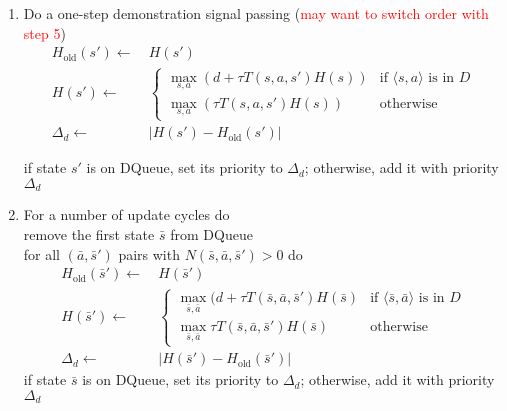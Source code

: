 \documentclass{article}
\begin{document}
\begin{enumerate}
\item Do a one-step demonstration signal passing (\textcolor{red}{may want to switch order with step 5})\\
\[
\begin{split}
H_{\text{old}}(s') \leftarrow\ & H(s')\\
H(s') \leftarrow\ & \begin{cases}
    \max_{s,a} (d + \tau T(s,a,s') H(s))& \text{if \(\langle s,a \rangle\) is in $D$}\\
    \max_{s,a} (\tau T(s,a,s') H(s))& \text{otherwise}
  \end{cases}\\
  \Delta_d \leftarrow\ & |H(s')-H_{\text{old}}(s')|
  \end{split}
\]

if state $s'$ is on DQueue, set its priority to $\Delta_d$; otherwise, add it with priority $\Delta_d$
\item For a number of update cycles do\\
remove the first state $\bar{s}$ from DQueue\\
for all $(\bar{a},\bar{s}')$ pairs with $N(\bar{s},\bar{a},\bar{s}')>0$ do
\[
\begin{split}
H_{\text{old}}(\bar{s}') \leftarrow\ & H(\bar{s}')\\
H(\bar{s}') \leftarrow\ & \begin{cases}
    \max_{\bar{s},\bar{a}} (d + \tau  T(\bar{s},\bar{a},\bar{s}') H(\bar{s})& \text{if \(\langle \bar{s},\bar{a} \rangle\) is in $D$}\\
    \max_{\bar{s},\bar{a}} \tau  T(\bar{s},\bar{a},\bar{s}') H(\bar{s})& \text{otherwise}
  \end{cases}\\
  \Delta_d \leftarrow\ & |H(\bar{s}')-H_{\text{old}}(\bar{s}')|
  \end{split}
\] 
if state $\bar{s}$ is on DQueue, set its priority to $\Delta_d$; otherwise, add it with priority $\Delta_d$




	
\end{enumerate}
\end{document}
